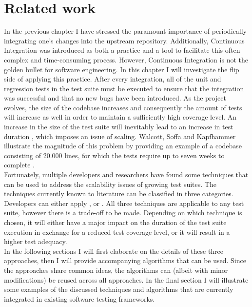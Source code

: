 
\chapter{Related work}
In the previous chapter I have stressed the paramount importance of periodically integrating one's changes into the upstream repository. Additionally, Continuous Integration was introduced as both a practice and a tool to facilitate this often complex and time-consuming process. However, Continuous Integration is not the golden bullet for software engineering. In this chapter I will investigate the flip side of applying this practice. After every integration, all of the unit and regression tests in the test suite must be executed to ensure that the integration was successful and that no new bugs have been introduced. As the project evolves, the size of the codebase increases and consequently the amount of tests will increase as well in order to maintain a sufficiently high coverage level. An increase in the size of the test suite will inevitably lead to an increase in test duration \cite{evaluationoftestsuiteminimization}, which imposes an issue of scaling. Walcott, Soffa and Kapfhammer illustrate the magnitude of this problem by providing an example of a codebase consisting of 20.000 lines, for which the tests require up to seven weeks to complete \cite{10.1145/1146238.1146240}.\\

\noindent Fortunately, multiple developers and researchers have found some techniques that can be used to address the scalability issues of growing test suites. The techniques currently known to literature can be classified in three categories. Developers can either apply \emph{\tsm{}}, \emph{\tcs{}} or \emph{\tcp{}} \cite{evaluationoftestsuiteminimization}. All three techniques are applicable to any test suite, however there is a trade-off to be made. Depending on which technique is chosen, it will either have a major impact on the duration of the test suite execution in exchange for a reduced test coverage level, or it will result in a higher test adequacy.\\

\noindent In the following sections I will first elaborate on the details of these three approaches, then I will provide accompanying algorithms that can be used. Since the approaches share common ideas, the algorithms can (albeit with minor modifications) be reused across all approaches. In the final section I will illustrate some examples of the discussed techniques and algorithms that are currently integrated in existing software testing frameworks.



